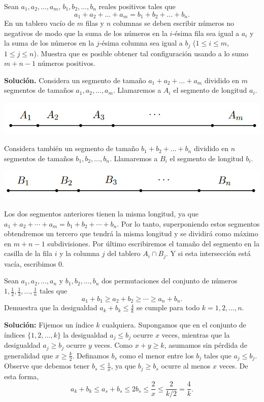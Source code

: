 \documentclass[11pt]{scrartcl}
\begin{document}
\begin{example}[Rusia]
Sean $a_1, a_2, \dots, a_m$, $b_1, b_2, \dots, b_n$ reales positivos tales que
\[
a_1 + a_2 + \dots + a_m = b_1 + b_2 + \dots + b_n.
\]
En un tablero vacío de $m$ filas y $n$ columnas se deben escribir números no negativos de modo que la suma de los números en la $i$-ésima fila sea igual a $a_i$ y la suma de los números en la $j$-ésima columna sea igual a $b_j$ ($1 \leq i \leq m$, $1 \leq j \leq n$). Muestra que es posible obtener tal configuración usando a lo sumo $m + n - 1$ números positivos.
\end{example}
\textbf{Solución.} Considera un segmento de tamaño $a_1 + a_2 + \dots + a_m$ dividido en $m$ segmentos de tamaños $a_1, a_2, \dots, a_m$. Llamaremos a $A_i$ el segmento de longitud $a_i$.
\begin{center}
    \includegraphics[scale=.75]{images/clase_14-rusia1.png}
\end{center}
Considera también un segmento de tamaño $b_1 + b_2 + \dots + b_n$ dividido en $n$ segmentos de tamaños $b_1, b_2, \dots, b_n$. Llamaremos a $B_i$ el segmento de longitud $b_i$.
\begin{center}
    \includegraphics[scale=.75]{images/clase_14-rusia2.png}
\end{center}
Los dos segmentos anteriores tienen la misma longitud, ya que \(a_1 + a_2 + \cdots + a_m = b_1 + b_2 + \cdots + b_n\). Por lo tanto, superponiendo estos segmentos obtendremos un tercero que tendrá la misma longitud y se dividirá como máximo en \(m + n - 1\) subdivisiones. Por último escribiremos el tamaño del segmento en la casilla de la fila \(i\) y la columna \(j\) del tablero \(A_i \cap B_j\). Y si esta intersección está vacía, escribimos 0.

\begin{example}
Sean \( a_1, a_2, \dots, a_n \) y \( b_1, b_2, \dots, b_n \) dos permutaciones del conjunto de números \( 1, \frac{1}{2}, \frac{1}{3}, \dots, \frac{1}{n} \) tales que  
\[
a_1 + b_1 \geq a_2 + b_2 \geq \cdots \geq a_n + b_n.
\]  
Demuestra que la desigualdad \( a_k + b_k \leq \frac{4}{k} \) se cumple para todo \( k = 1, 2, \dots, n \).
\end{example}
\textbf{Solución:}  
Fijemos un índice \( k \) cualquiera. Supongamos que en el conjunto de índices \( \{1, 2, \dots, k\} \) la desigualdad \( a_j \leq b_j \) ocurre \( x \) veces, mientras que la desigualdad \( a_j \geq b_j \) ocurre \( y \) veces. Como \( x + y \geq k \), asumamos sin pérdida de generalidad que \( x \geq \frac{k}{2} \). Definamos \( b_s \) como el menor entre los \( b_j \) tales que \( a_j \leq b_j \). Observe que debemos tener \( b_s \leq \frac{1}{x} \), ya que \( b_j \geq b_s \) ocurre al menos \( x \) veces. De esta forma,  
\[
a_k + b_k \leq a_s + b_s \leq 2b_s \leq \frac{2}{x} \leq \frac{2}{k/2} = \frac{4}{k}.
\]
\end{document}
